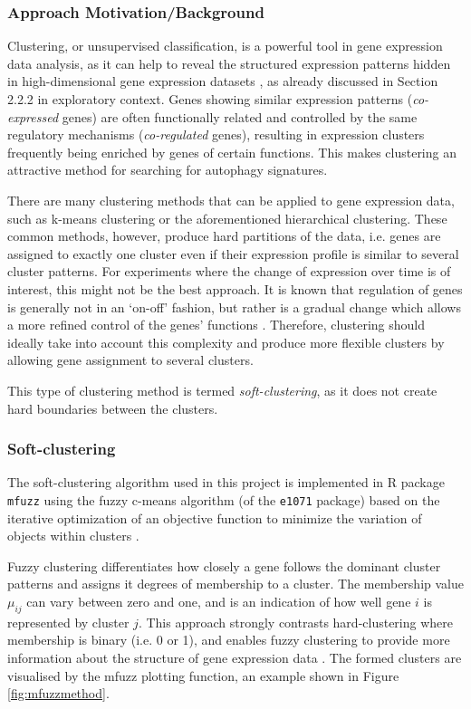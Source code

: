  
\subsubsection{Approach Motivation/Background}
Clustering, or unsupervised classification,  is a powerful tool in gene expression data analysis, as it can help to reveal the structured expression patterns hidden in high-dimensional gene expression datasets \cite{Kumar2007Mfuzz:Data}, as already discussed in Section 2.2.2 in exploratory context. Genes showing similar expression patterns (\textit{co-expressed} genes) are often functionally related and controlled by the same regulatory mechanisms (\textit{co-regulated} genes), resulting in expression clusters frequently being enriched by genes of certain functions. This makes clustering an attractive method for searching for autophagy signatures. 
 
There are many clustering methods that can be applied to gene expression data, such as k-means clustering or the aforementioned hierarchical clustering. These common methods, however, produce hard partitions of the data, i.e. genes are assigned to exactly one cluster even if their expression profile is similar to several cluster patterns. For experiments where the change of expression over time is of interest, this might not be the best approach. It is known that regulation of genes is generally not in an `on-off' fashion, but rather is a gradual change which allows a more refined control of the genes' functions  \cite{Kumar2007Mfuzz:Data}. Therefore, clustering should ideally take into account this complexity and produce more flexible clusters by allowing gene assignment to several clusters.
 
This type of clustering method is termed \textit{soft-clustering}, as it does not  create hard boundaries between the clusters. 
 
\subsubsection{Soft-clustering}
 
The soft-clustering algorithm used in this project is implemented in R package \texttt{mfuzz} \cite{Kumar2007Mfuzz:Data}  using the fuzzy c-means algorithm (of the \texttt{e1071} package) based on the iterative optimization of an
objective function to minimize the variation of objects within clusters  \cite{Bezdek1981PatternAlgorithms}.
 
Fuzzy clustering differentiates how closely a gene follows the dominant cluster patterns and assigns it degrees of membership to a cluster. The membership value $\mu_{ij}$ can vary between zero and one, and is an indication of how well gene $i$ is represented by cluster $j$. This approach strongly contrasts hard-clustering where membership is binary (i.e. 0 or 1), and enables fuzzy clustering to provide more information about the structure of gene expression data \cite{Kumar2007Mfuzz:Data}. 
The formed clusters are visualised by the mfuzz plotting function, an example shown in Figure \ref{fig:mfuzzmethod}. 

